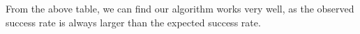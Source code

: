 From the above table, we can find our algorithm works very well, as the observed
success rate is always larger than the expected success rate.
%
% 